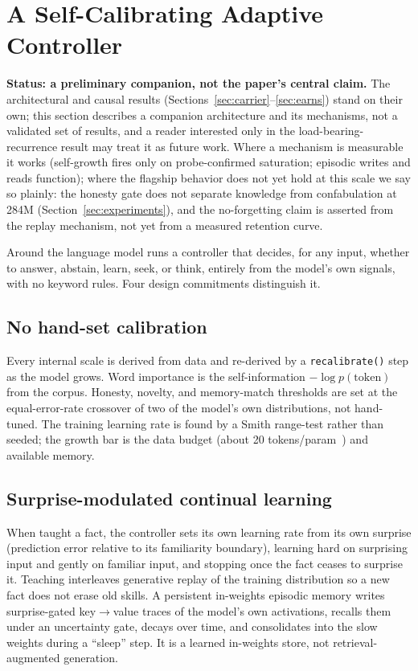 \documentclass[10pt,twocolumn]{article}
\newcommand{\code}[1]{\texttt{#1}}
\begin{document}
\section{A Self-Calibrating Adaptive Controller}
\label{sec:controller}
\noindent\textbf{Status: a preliminary companion, not the paper's central claim.} The architectural and causal results (Sections~\ref{sec:carrier}--\ref{sec:earns}) stand on their own; this section describes a companion architecture and its mechanisms, not a validated set of results, and a reader interested only in the load-bearing-recurrence result may treat it as future work. Where a mechanism is measurable it works (self-growth fires only on probe-confirmed saturation; episodic writes and reads function); where the flagship behavior does not yet hold at this scale we say so plainly: the honesty gate does not separate knowledge from confabulation at 284M (Section~\ref{sec:experiments}), and the no-forgetting claim is asserted from the replay mechanism, not yet from a measured retention curve.

Around the language model runs a controller that decides, for any input, whether to answer, abstain, learn, seek, or think, entirely from the model's own signals, with no keyword rules. Four design commitments distinguish it.

\subsection{No hand-set calibration}
Every internal scale is derived from data and re-derived by a \code{recalibrate()} step as the model grows. Word importance is the self-information $-\log p(\text{token})$ from the corpus. Honesty, novelty, and memory-match thresholds are set at the equal-error-rate crossover of two of the model's own distributions, not hand-tuned. The training learning rate is found by a Smith range-test rather than seeded; the growth bar is the data budget (about 20 tokens/param~\cite{hoffmann2022chinchilla}) and available memory.

\subsection{Surprise-modulated continual learning}
When taught a fact, the controller sets its own learning rate from its own surprise (prediction error relative to its familiarity boundary), learning hard on surprising input and gently on familiar input, and stopping once the fact ceases to surprise it. Teaching interleaves generative replay of the training distribution so a new fact does not erase old skills. A persistent in-weights episodic memory writes surprise-gated key$\to$value traces of the model's own activations, recalls them under an uncertainty gate, decays over time, and consolidates into the slow weights during a ``sleep'' step. It is a learned in-weights store, not retrieval-augmented generation.
\end{document}
